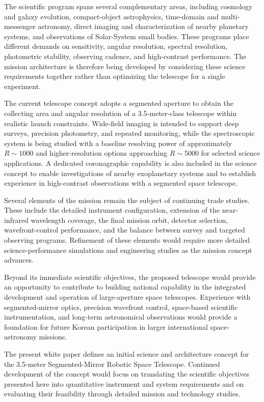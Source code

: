 The scientific program spans several complementary areas, including
cosmology and galaxy evolution, compact-object astrophysics, time-domain
and multi-messenger astronomy, direct imaging and characterization of
nearby planetary systems, and observations of Solar-System small bodies.
These programs place different demands on sensitivity, angular resolution,
spectral resolution, photometric stability, observing cadence, and
high-contrast performance. The mission architecture is therefore being
developed by considering these science requirements together rather than
optimizing the telescope for a single experiment.

The current telescope concept adopts a segmented aperture to obtain the
collecting area and angular resolution of a 3.5-meter-class telescope
within realistic launch constraints. Wide-field imaging is intended to
support deep surveys, precision photometry, and repeated monitoring, while
the spectroscopic system is being studied with a baseline resolving power
of approximately $R \sim 1000$ and higher-resolution options approaching
$R \sim 5000$ for selected science applications. A dedicated coronagraphic
capability is also included in the science concept to enable investigations
of nearby exoplanetary systems and to establish experience in high-contrast
observations with a segmented space telescope.

Several elements of the mission remain the subject of continuing trade
studies. These include the detailed instrument configuration, extension of
the near-infrared wavelength coverage, the final mission orbit, detector
selection, wavefront-control performance, and the balance between survey
and targeted observing programs. Refinement of these elements would require
more detailed science-performance simulations and engineering studies as
the mission concept advances.

Beyond its immediate scientific objectives, the proposed telescope would
provide an opportunity to contribute to building national capability in the
integrated development and operation of large-aperture space telescopes.
Experience with segmented-mirror optics, precision wavefront control, space-based
scientific instrumentation, and long-term astronomical observations would
provide a foundation for future Korean participation in larger international
space-astronomy missions.

The present white paper defines an initial science and architecture concept
for the 3.5-meter Segmented-Mirror Robotic Space Telescope. Continued
development of the concept would focus on translating the scientific
objectives presented here into quantitative instrument and system
requirements and on evaluating their feasibility through detailed mission
and technology studies.


